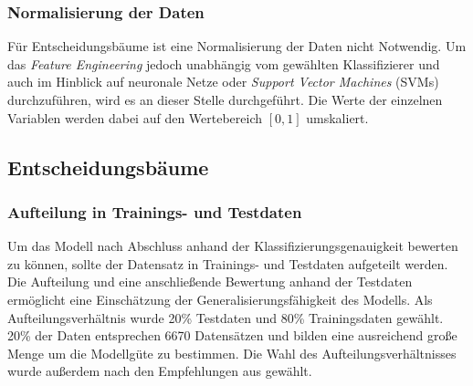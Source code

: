 \subsubsection{Normalisierung der Daten}
Für Entscheidungsbäume ist eine Normalisierung der Daten nicht Notwendig. Um das \emph{Feature Engineering} jedoch unabhängig vom gewählten Klassifizierer und auch im Hinblick auf neuronale Netze oder \emph{Support Vector Machines} (SVMs) durchzuführen, wird es an dieser Stelle durchgeführt. Die Werte der einzelnen Variablen werden dabei auf den Wertebereich $[0, 1]$ umskaliert.
 

\subsection{Entscheidungsbäume}
\label{section:Entscheidungsbäume}
\subsubsection{Aufteilung in Trainings- und Testdaten}
\label{section:train_test_split}
Um das Modell nach Abschluss anhand der Klassifizierungsgenauigkeit bewerten zu können, sollte der Datensatz in Trainings- und Testdaten aufgeteilt werden. Die Aufteilung und eine anschließende Bewertung anhand der Testdaten ermöglicht eine Einschätzung der Generalisierungsfähigkeit des Modells. Als Aufteilungsverhältnis wurde 20\% Testdaten und 80\% Trainingsdaten gewählt. 20\% der Daten entsprechen 6670 Datensätzen und bilden eine ausreichend große Menge um die Modellgüte zu bestimmen. Die Wahl des Aufteilungsverhältnisses wurde außerdem nach den Empfehlungen aus \cite{geron2017hands-on} gewählt.

